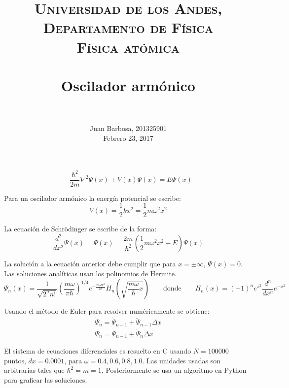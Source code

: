 \documentclass[paper=letter, fontsize=11pt]{scrartcl}
\title{
        \usefont{OT1}{bch}{b}{n}
        \normalfont \normalsize \textsc{Universidad de los Andes, Departamento de F\'isica \\
        F\'isica at\'omica} \\ [25pt]
        \horrule{0.5pt} \\[0.4cm]
        \huge Oscilador arm\'onico \\
        \horrule{2pt} \\[0.5cm]
}
\author{
        \normalfont                                 \normalsize
        Juan Barbosa, 201325901\\[-3pt]      \normalsize
        Febrero 23, 2017
}
\date{}
\begin{document}
\maketitle

\[
\boxed{-\dfrac{\hbar^2}{2m}\nabla^2\Psi(x) + V(x)\Psi(x) = E\Psi(x)}
\]

Para un oscilador arm\'onico la energ\'ia potencial se escribe:
\begin{equation}
	V(x) = \dfrac{1}{2}kx^2 = \dfrac{1}{2}m\omega^2x^2
\end{equation}

La ecuaci\'on de Schr\"odinger se escribe de la forma:
\begin{equation}
	\dfrac{d^2}{dx^2}\Psi(x) = \ddot{\Psi}(x) =  \dfrac{2m}{\hbar^2}\left(\dfrac{1}{2}m\omega^2x^2-E\right)\Psi(x)
\end{equation}

La soluci\'on a la ecuaci\'on anterior debe cumplir que para $x = \pm\infty$, $\Psi(x) = 0$. Las soluciones anal\'iticas usan los polinomios de Hermite.
\begin{equation}
	\Psi_n(x) = \dfrac{1}{\sqrt{2^nn!}}\left(\dfrac{m\omega}{\pi\hbar}\right)^{1/4}e^{-\frac{m\omega x^2}{2\hbar}}H_n\left(\sqrt{\dfrac{m\omega}{\hbar}x}\right)
	\qquad \text{donde} \qquad	H_n(x) = (-1)^ne^{x^2}\dfrac{d^n}{dx^n}e^{-x^2}
\end{equation}

Usando el m\'etodo de Euler para resolver num\'ericamente se obtiene:
\begin{equation}
	\begin{matrix}
	\dot{\Psi}_n = \dot{\Psi}_{n-1} + \ddot{\Psi}_{n-1}\Delta x \\
	\Psi_n = \Psi_{n-1} + \dot{\Psi}_n\Delta x
	\end{matrix}
\end{equation}

El sistema de ecuaciones diferenciales es resuelto en C usando $N = 100000$ puntos, $dx = 0.0001$, para $\omega = 0.4, 0.6, 0.8, 1.0$. Las unidades usadas son arbitrarias tales que $\hbar^2 = m = 1$. Posteriormente se usa un algoritmo en Python para graficar las soluciones.
\end{document}
